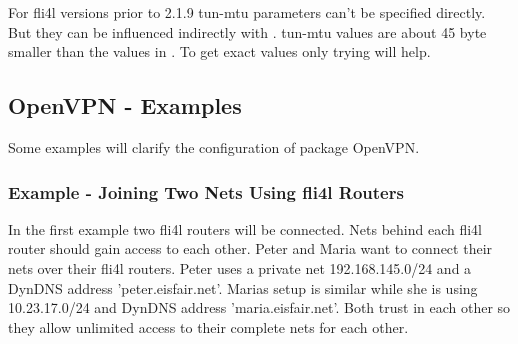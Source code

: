 For fli4l versions prior to 2.1.9 \glqq{}tun-mtu\grqq{} parameters 
can't be specified directly. But they can be influenced indirectly 
with . tun-mtu values are about 45 byte 
smaller than the values in . To get exact 
values only trying will help.

\subsection{OpenVPN - Examples}

Some examples will clarify the configuration of package OpenVPN.

\subsubsection{Example - Joining Two Nets Using fli4l Routers}

In the first example two fli4l routers will be connected. Nets behind 
each fli4l router should gain access to each other. Peter and Maria want 
to connect their nets over their fli4l routers. Peter uses a private net 
192.168.145.0/24 and a DynDNS address 'peter.eisfair.net'. Marias setup 
is similar while she is using 10.23.17.0/24 and DynDNS address 
'maria.eisfair.net'. Both trust in each other so they allow unlimited 
access to their complete nets for each other.

